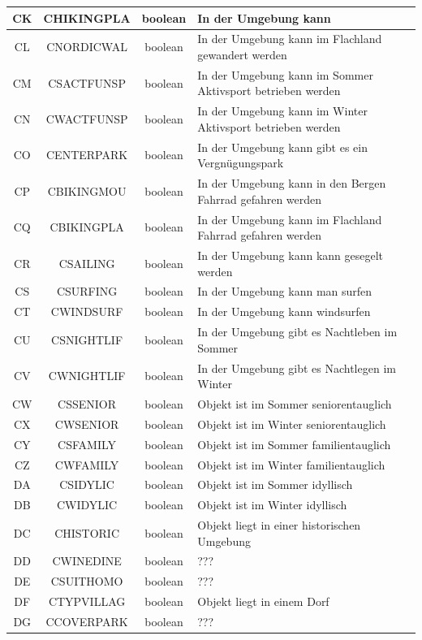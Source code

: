 \begin{longtable}{ | c | c | c | L{7.5cm} | }
	CK & CHIKINGPLA & boolean & In der Umgebung kann  \\ \hline 
	CL & CNORDICWAL & boolean & In der Umgebung kann im Flachland gewandert werden \\ \hline 
	CM & CSACTFUNSP & boolean & In der Umgebung kann im Sommer Aktivsport betrieben werden \\ \hline 
	CN & CWACTFUNSP & boolean & In der Umgebung kann im Winter Aktivsport betrieben werden \\ \hline 
	CO & CENTERPARK & boolean & In der Umgebung kann gibt es ein Vergnügungspark \\ \hline 
	CP & CBIKINGMOU & boolean & In der Umgebung kann in den Bergen Fahrrad gefahren werden \\ \hline 
	CQ & CBIKINGPLA & boolean & In der Umgebung kann im Flachland Fahrrad gefahren werden \\ \hline 
	CR & CSAILING & boolean & In der Umgebung kann kann gesegelt werden \\ \hline 
	CS & CSURFING & boolean & In der Umgebung kann man surfen \\ \hline 
	CT & CWINDSURF & boolean & In der Umgebung kann windsurfen \\ \hline 
	CU & CSNIGHTLIF & boolean & In der Umgebung gibt es Nachtleben im Sommer \\ \hline 
	CV & CWNIGHTLIF & boolean & In der Umgebung gibt es Nachtlegen im Winter \\ \hline 
	CW & CSSENIOR & boolean & Objekt ist im Sommer seniorentauglich \\ \hline 
	CX & CWSENIOR & boolean & Objekt ist im Winter seniorentauglich \\ \hline 
	CY & CSFAMILY & boolean & Objekt ist im Sommer familientauglich \\ \hline 
	CZ & CWFAMILY & boolean & Objekt ist im Winter familientauglich \\ \hline 
	DA & CSIDYLIC & boolean & Objekt ist im Sommer idyllisch \\ \hline 
	DB & CWIDYLIC & boolean & Objekt ist im Winter idyllisch \\ \hline 
	DC & CHISTORIC & boolean & Objekt liegt in einer historischen Umgebung \\ \hline 
	DD & CWINEDINE & boolean & ??? \\ \hline 
	DE & CSUITHOMO & boolean & ??? \\ \hline 
	DF & CTYPVILLAG & boolean & Objekt liegt in einem Dorf \\ \hline 
	DG & CCOVERPARK & boolean & ??? \\ \hline 

\end{longtable}
